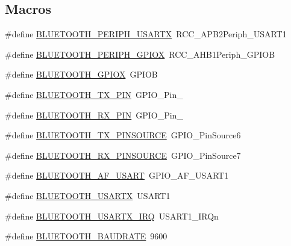 \subsection*{Macros}
\begin{DoxyCompactItemize}
\item 
\#define \hyperlink{group__bluetooth___constants_gac4b97204cfdd1ad5faebd0a56a6521c6}{B\+L\+U\+E\+T\+O\+O\+T\+H\+\_\+\+P\+E\+R\+I\+P\+H\+\_\+\+U\+S\+A\+R\+TX}~R\+C\+C\+\_\+\+A\+P\+B2\+Periph\+\_\+\+U\+S\+A\+R\+T1
\item 
\#define \hyperlink{group__bluetooth___constants_gab9bf1b33e271246e795a3847516e0949}{B\+L\+U\+E\+T\+O\+O\+T\+H\+\_\+\+P\+E\+R\+I\+P\+H\+\_\+\+G\+P\+I\+OX}~R\+C\+C\+\_\+\+A\+H\+B1\+Periph\+\_\+\+G\+P\+I\+OB
\item 
\#define \hyperlink{group__bluetooth___constants_gad47fcf58a7d55e48e039420b36350fcd}{B\+L\+U\+E\+T\+O\+O\+T\+H\+\_\+\+G\+P\+I\+OX}~G\+P\+I\+OB
\item 
\#define \hyperlink{group__bluetooth___constants_ga03828dc38b1dd4e24867280ccaf54c1e}{B\+L\+U\+E\+T\+O\+O\+T\+H\+\_\+\+T\+X\+\_\+\+P\+IN}~G\+P\+I\+O\+\_\+\+Pin\+\_
\item 
\#define \hyperlink{group__bluetooth___constants_gad6b845bce7449baa7ebc4f2625c32165}{B\+L\+U\+E\+T\+O\+O\+T\+H\+\_\+\+R\+X\+\_\+\+P\+IN}~G\+P\+I\+O\+\_\+\+Pin\+\_
\item 
\#define \hyperlink{group__bluetooth___constants_gaae23de9ae44f36e0a519e010e545d579}{B\+L\+U\+E\+T\+O\+O\+T\+H\+\_\+\+T\+X\+\_\+\+P\+I\+N\+S\+O\+U\+R\+CE}~G\+P\+I\+O\+\_\+\+Pin\+Source6
\item 
\#define \hyperlink{group__bluetooth___constants_gaf8abe33a7c3b953bc50789da61176ce8}{B\+L\+U\+E\+T\+O\+O\+T\+H\+\_\+\+R\+X\+\_\+\+P\+I\+N\+S\+O\+U\+R\+CE}~G\+P\+I\+O\+\_\+\+Pin\+Source7
\item 
\#define \hyperlink{group__bluetooth___constants_ga89cad714e99e26757fe9208e98c6cbe9}{B\+L\+U\+E\+T\+O\+O\+T\+H\+\_\+\+A\+F\+\_\+\+U\+S\+A\+RT}~G\+P\+I\+O\+\_\+\+A\+F\+\_\+\+U\+S\+A\+R\+T1
\item 
\#define \hyperlink{group__bluetooth___constants_gac9aff5be09be7a2e3c84d99794f80dc3}{B\+L\+U\+E\+T\+O\+O\+T\+H\+\_\+\+U\+S\+A\+R\+TX}~U\+S\+A\+R\+T1
\item 
\#define \hyperlink{group__bluetooth___constants_ga6049290b6a001e8af7bc24ebe06f8ee8}{B\+L\+U\+E\+T\+O\+O\+T\+H\+\_\+\+U\+S\+A\+R\+T\+X\+\_\+\+I\+RQ}~U\+S\+A\+R\+T1\+\_\+\+I\+R\+Qn
\item 
\#define \hyperlink{group__bluetooth___constants_ga800ec9bb77245339c6a2b770432e0232}{B\+L\+U\+E\+T\+O\+O\+T\+H\+\_\+\+B\+A\+U\+D\+R\+A\+TE}~9600
\end{DoxyCompactItemize}


